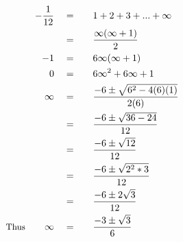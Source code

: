 \begin{alignat*}{5}
&\,&-\frac{1}{12}\quad&=\quad&&1+2+3+...+\infty\\
&\,&\,&=&&\frac{\infty(\infty+1)}{2}\\
&\,&-1\quad&=&&6\infty(\infty+1)\\
&\,&0\quad&=&&6\infty^2+6\infty+1\\
&\,&\infty\quad&=&&\frac{-6\pm\sqrt{6^2-4(6)(1)}}{2(6)}\\
&\,&\,&=&&\frac{-6\pm\sqrt{36-24}}{12}\\
&\,&\,&=&&\frac{-6\pm\sqrt{12}}{12}\\
&\,&\,&=&&\frac{-6\pm\sqrt{2^2*3}}{12}\\
&\,&\,&=&&\frac{-6\pm2\sqrt{3}}{12}\\
&\small\text{Thus}&\infty\quad&=&&\frac{-3\pm\sqrt{3}}{6}
\end{alignat*}
